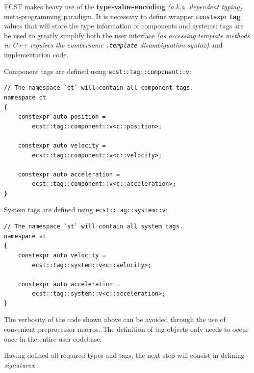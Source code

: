 \documentclass[oneside, 12pt, a4paper, openany]{book}
\begin{document}
ECST makes heavy use of the \textbf{type-value-encoding} \emph{(a.k.a.
dependent typing)} meta-programming paradigm. It is necessary to define
wrapper
\texttt{constexpr}
\textbf{tag} values that will store the type information of components
and systems: tags are be used to greatly simplify both the user
interface \emph{(as accessing template methods in C++ requires the
cumbersome
\texttt{.template}
disambiguation syntax)} and implementation code.

Component tags are defined using
\texttt{ecst::tag::component::v}:

\begin{verbatim}
// The namespace `ct` will contain all component tags.
namespace ct
{
    constexpr auto position =
        ecst::tag::component::v<c::position>;

    constexpr auto velocity =
        ecst::tag::component::v<c::velocity>;

    constexpr auto acceleration =
        ecst::tag::component::v<c::acceleration>;
}
\end{verbatim}

System tags are defined using
\texttt{ecst::tag::system::v}:

\begin{verbatim}
// The namespace `st` will contain all system tags.
namespace st
{
    constexpr auto velocity =
        ecst::tag::system::v<c::velocity>;

    constexpr auto acceleration =
        ecst::tag::system::v<c::acceleration>;
}
\end{verbatim}

The verbosity of the code shown above can be avoided through the use of
convenient preprocessor macros. The definition of tag objects only needs
to occur once in the entire user codebase.

Having defined all required types and tags, the next step will consist
in defining \emph{signatures}:
\end{document}

